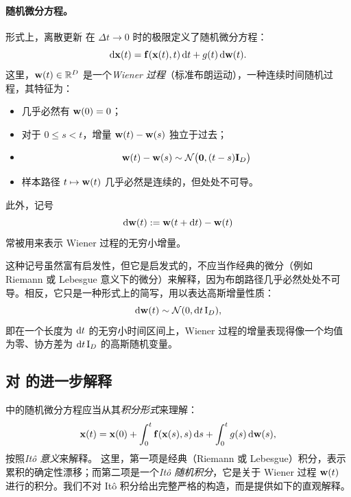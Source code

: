 \paragraph{随机微分方程。}
形式上，离散更新  在 $ \Delta t \to 0 $ 时的极限定义了随机微分方程：
\begin{equation}
    \mathop{}\!\mathrm{d} {\mathbf{x}}(t) = {\mathbf{f}}({\mathbf{x}}(t), t)\mathop{}\!\mathrm{d} t + g(t) \mathop{}\!\mathrm{d} {\mathbf{w}}(t).
    \label{eq:sde}
\end{equation}
这里，$ {\mathbf{w}}(t) \in \mathbb{R}^D $ 是一个\emph{Wiener 过程}（标准布朗运动），一种连续时间随机过程，其特征为：
\begin{itemize}
    \item {} 几乎必然有 $ {\mathbf{w}}(0) = 0 $；
    \item {} 对于 $ 0 \leq s < t $，增量 $ {\mathbf{w}}(t) - {\mathbf{w}}(s) $ 独立于过去；
    \item {}
    \begin{align}\label{eq:wiener-gaussian}
        {\mathbf{w}}(t) - {\mathbf{w}}(s) \sim \mathcal{N}\bigl(\bm{0}, (t - s){\mathbf{I}}_D \bigr)
    \end{align}
    \item {} 样本路径 $ t \mapsto {\mathbf{w}}(t) $ 几乎必然是连续的，但处处不可导。
\end{itemize}
此外，记号
\[
\mathop{}\!\mathrm{d} {\mathbf{w}}(t) := {\mathbf{w}}(t + \mathop{}\!\mathrm{d} t) - {\mathbf{w}}(t)
\]
常被用来表示 Wiener 过程的无穷小增量。

这种记号虽然富有启发性，但它是启发式的，不应当作经典的微分（例如 Riemann 或 Lebesgue 意义下的微分）来解释，因为布朗路径几乎必然处处不可导。相反，它只是一种形式上的简写，用以表达高斯增量性质：
\[
\mathop{}\!\mathrm{d} {\mathbf{w}}(t) \sim \mathcal{N}(0, \mathop{}\!\mathrm{d} t\, \mathrm{I}_D),
\]
即在一个长度为 $ \mathop{}\!\mathrm{d} t $ 的无穷小时间区间上，Wiener 过程的增量表现得像一个均值为零、协方差为 $ \mathop{}\!\mathrm{d} t\, \mathrm{I}_D $ 的高斯随机变量。




\subsection{对  的进一步解释}
 中的随机微分方程应当从其\emph{积分形式}来理解：
\begin{align}\label{eq:sde-integral-form}
    {\mathbf{x}}(t) = {\mathbf{x}}(0) + \int_0^t {\mathbf{f}}({\mathbf{x}}(s), s) \mathop{}\!\mathrm{d} s + \int_0^t g(s) \mathop{}\!\mathrm{d} {\mathbf{w}}(s),
\end{align}
按照\emph{Itô 意义}来解释。
这里，第一项是经典（Riemann 或 Lebesgue）积分，表示累积的确定性漂移；而第二项是一个\emph{Itô 随机积分}，它是关于 Wiener 过程 $ {\mathbf{w}}(t) $ 进行的积分。我们不对 Itô 积分给出完整严格的构造，而是提供如下的直观解释。


